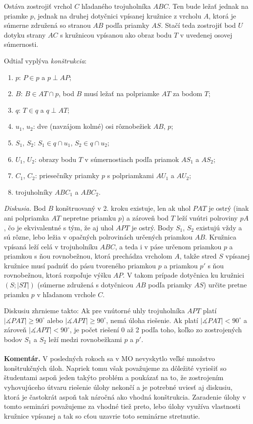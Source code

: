 \documentclass[11pt,a4paper,oneside,final]{book}
\newcommand{\kom}{\textbf{Komentár.} }
\newcommand{\ma}{\measuredangle}
\begin{document}
Ostáva zostrojiť vrchol $C$ hľadaného trojuholníka $ABC$. Ten bude ležať jednak na priamke $p$, jednak na druhej dotyčnici vpísanej kružnice z vrcholu $A$, ktorá je súmerne združená so stranou $AB$ podľa priamky $AS$. Stačí teda zostrojiť bod $U$ dotyku strany $AC$ s kružnicou vpísanou ako obraz bodu $T$ v uvedenej osovej súmernosti.

Odtiaľ vyplýva \textit{konštrukcia}:
\begin{enumerate}
\item $p$: $P \in p$ a $p \perp AP$;
\item $B$: $B \in AT \cap p$, bod $B$ musí ležať na polpriamke $AT$ za bodom $T$;
\item $q$: $T \in q$ a $q \perp AT$;
\item $u_1$, $u_2$: dve (navzájom kolmé) osi rôznobežiek $AB$, $p$;
\item $S_1$, $S_2$: $S_1 \in q \cap u_1$, $S_2 \in q \cap u_2$;
\item $U_1$, $U_2$: obrazy bodu $T$ v súmernostiach podľa priamok $AS_1$ a $AS_2$;
\item $C_1$, $C_2$: priesečníky priamky $p$ s polpriamkami $AU_1$ a $AU_2$;
\item trojuholníky $ABC_1$ a $ABC_2$.
\end{enumerate}
\textit{Diskusia.} Bod $B$ konštruovaný v 2. kroku existuje, len ak uhol $PAT$ je ostrý (inak ani polpriamka $AT$ nepretne priamku $p$) a zároveň bod $T$ leží vnútri polroviny $pA$, čo je ekvivalentné s tým, že aj uhol $APT$ je ostrý. Body $S_1$, $S_2$ existujú vždy a sú rôzne, lebo ležia v opačných polrovinách určených priamkou $AB$. Kružnica vpísaná leží celá v trojuholníku $ABC$, a teda i v páse určenom priamkou $p$ a priamkou s ňou rovnobežnou, ktorá prechádza vrcholom $A$, takže stred $S$ vpísanej kružnice musí padnúť do pásu tvoreného priamkou $p$ a priamkou $p'$ s ňou rovnobežnou, ktorá rozpoľuje výšku $AP$. V takom prípade dotyčnica ku kružnici $(S; |ST|)$ (súmerne združená s dotyčnicou $AB$ podľa priamky $AS$) určite pretne priamku $p$ v hľadanom vrchole $C$.

Diskusiu zhrnieme takto: Ak pre vnútorné uhly trojuholníka $APT$ platí $|\ma PAT| \geq 90^\circ$ alebo $|\ma APT| \geq 90^\circ$, nemá úloha riešenie. Ak platí $|\ma PAT| < 90^\circ$ a zároveň $|\ma APT| < 90^\circ$, je počet riešení 0 až 2 podľa toho, koľko zo zostrojených bodov $S_1$ a $S_2$ leží medzi rovnobežkami $p$ a $p'$.\\
\\
\kom V posledných rokoch sa v MO nevyskytlo veľké množstvo konštrukčných úloh. Napriek tomu však považujeme za dôležité vyriešiť so študentami aspoň jeden takýto problém a poukázať na to, že zostrojením vyhovujúceho útvaru riešenie úlohy nekončí a je potrebné uviesť aj diskusiu, ktorá je častokrát aspoň tak náročná ako vhodná konštrukcia. Zaradenie úlohy v tomto seminári považujeme za vhodné tiež preto, lebo úlohy využíva vlastnosti kružnice vpísanej a tak so cťou uzavrie toto seminárne stretnutie.
\end{document}

